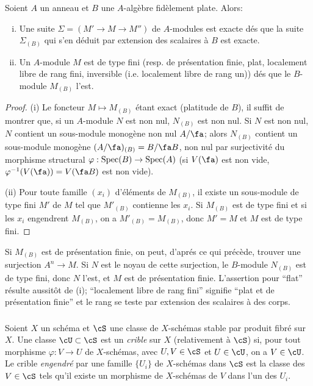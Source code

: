 \begin{proposition}\label{I:1-4-2}
Soient $A$ un anneau et $B$ une $A$-algèbre fidèlement plate. Alors:
\begin{enumerate}[(i)]
  \item Une suite $\Sigma=(M'\to M\to M'')$ de $A$-modules est exacte dés 
    que la suite $\Sigma_{(B)}$ qui s'en déduit par extension des scalaires 
    à $B$ est exacte.
  \item Un $A$-module $M$ est de type fini (resp. de présentation finie, 
    plat, localement libre de rang fini, inversible (i.e. localement libre 
    de rang un)) dés que le $B$-module $M_{(B)}$ l'est.
\end{enumerate}
\end{proposition}
\begin{proof}
(i) Le foncteur $M\mapsto M_{(B)}$ étant exact (platitude de $B$), il suffit 
de montrer que, si un $A$-module $N$ est non nul, $N_{(B)}$ est non nul. Si 
$N$ est non nul, $N$ contient un sous-module monogène non nul $A/\fa$; alors 
$N_{(B)}$ contient un sous-module monogène $(A/\fa)_{(B)} = B/\fa B$, non nul 
par surjectivité du morphisme structural $\varphi:\operatorname{Spec}(B)\to\operatorname{Spec}(A)$ (si 
$V(\fa)$ est non vide, $\varphi^{-1}(V(\fa))=V(\fa B)$ est non vide). 

(ii) Pour toute famille $(x_i)$ d'éléments de $M_{(B)}$, il existe un 
sous-module de type fini $M'$ de $M$ tel que $M'_{(B)}$ contienne les $x_i$. Si 
$M_{(B)}$ est de type fini et si les $x_i$ engendrent $M_{(B)}$, on a 
$M'_{(B)}=M_{(B)}$, donc $M'=M$ et $M$ est de type fini. 
\end{proof}

Si $M_{(B)}$ est de présentation finie, on peut, d'aprés ce qui précède, 
trouver une surjection $A^n\to M$. Si $N$ est le noyau de cette surjection, le 
$B$-module $N_{(B)}$ est de type fini, donc $N$ l'est, et $M$ est de 
présentation finie. L'assertion pour ``flat'' résulte aussitôt de (i); 
``localement libre de rang fini'' signifie ``plat et de présentation finie'' 
et le rang se teste par extension des scalaires à des corps.





\subsubsection{}\label{I:1-4-3}

Soient $X$ un schéma et $\cS$ une classe de $X$-schémas stable par produit 
fibré sur $X$. Une classe $\cU\subset \cS$ est un \emph{crible} sur $X$ 
(relativement à $\cS$) si, pour tout morphisme $\varphi:V\to U$ de 
$X$-schémas, avec $U,V\in \cS$ et $U\in\cU$, on a $V\in \cU$. Le crible 
\emph{engendré} par une famille $\{U_i\}$ de $X$-schémas dans $\cS$ est la 
classe des $V\in\cS$ tels qu'il existe un morphisme de $X$-schémas de $V$ dans 
l'un des $U_i$. 






